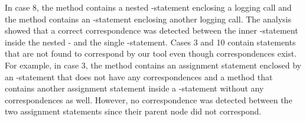 In case 8, the  method contains a nested -statement enclosing a logging call and the  method contains an -statement enclosing another logging call. The analysis showed that a correct correspondence was detected between the inner -statement inside the nested - and the single -statement. Cases 3 and 10 contain statements that are not found to correspond by our tool even though correspondences exist. For example, in case 3, the  method contains an assignment statement enclosed by an -statement that does not have any correspondences and a  method that contains another assignment statement inside a -statement without any correspondences as well. However, no correspondence was detected between the two assignment statements since their parent node did not correspond.



